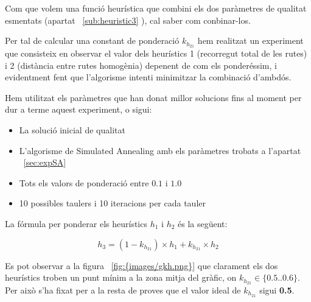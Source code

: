 
Com que volem una funció heurística que combini els dos paràmetres de qualitat esmentats (apartat ~\ref{sub:heuristic3}
), cal saber com conbinar-los. 

Per tal de calcular una constant de ponderació $k_{h_{21}}$ hem realitzat un experiment que consisteix en observar el valor dels heurístics 1 (recorregut total de les rutes) i 2 (distància entre rutes homogènia) depenent de com els ponderéssim, i evidentment fent que l'algorisme intenti minimitzar la combinació d'ambdós.

Hem utilitzat els paràmetres que han donat millor solucions fins al moment per dur a terme aquest experiment, o sigui:
\begin{itemize}
	\item La solució inicial de qualitat
	\item L'algorisme de Simulated Annealing amb els paràmetres trobats a l'apartat ~\ref{sec:expSA}
	\item Tots els valors de ponderació entre $0.1$ i $1.0$
	\item 10 possibles taulers i 10 iteracions per cada tauler
\end{itemize}

La fórmula per ponderar els heurístics $h_1$ i $h_2$ és la següent:

\begin{center}
	\large
	\[
		h_3 = (1 - k_{h_{21}}) \times h_1 + k_{h_{21}} \times h_2
	\]
\end{center}


Es pot observar a la figura ~\ref{fig:{images/gkh.png}} que clarament els dos heurístics troben un punt mínim a la zona mitja del gràfic, on $k_{h_{21}} \in \{ 0.5 .. 0.6\}$. Per això s'ha fixat per a la resta de proves que el valor ideal de $k_{h_{21}}$ sigui \textbf{0.5}.

